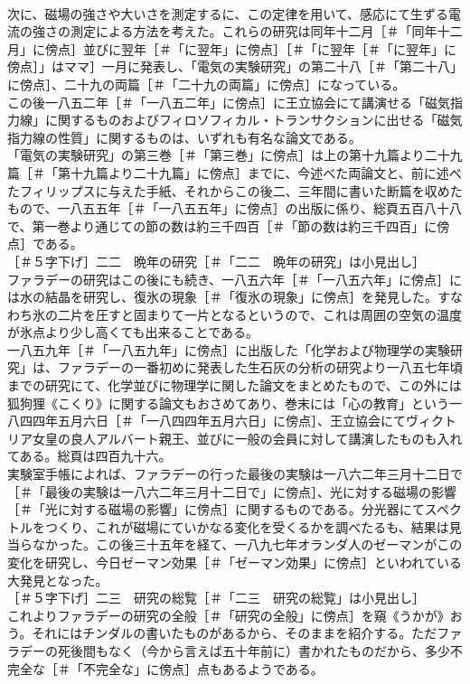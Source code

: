 \documentclass[8pt]{extreport}
\begin{document}
\begin{CJK}{UTF8}{min}
\\	次に、磁場の強さや大いさを測定するに、この定律を用いて、感応にて生ずる電流の強さの測定による方法を考えた。これらの研究は同年十二月［＃「同年十二月」に傍点］並びに翌年［＃「に翌年」に傍点］［＃「に翌年［＃「に翌年」に傍点］」はママ］一月に発表し、「電気の実験研究」の第二十八［＃「第二十八」に傍点］、二十九の両篇［＃「二十九の両篇」に傍点］になっている。
\\	この後一八五二年［＃「一八五二年」に傍点］に王立協会にて講演せる「磁気指力線」に関するものおよびフィロソフィカル・トランサクションに出せる「磁気指力線の性質」に関するものは、いずれも有名な論文である。
\\	「電気の実験研究」の第三巻［＃「第三巻」に傍点］は上の第十九篇より二十九篇［＃「第十九篇より二十九篇」に傍点］までに、今述べた両論文と、前に述べたフィリップスに与えた手紙、それからこの後二、三年間に書いた断篇を収めたもので、一八五五年［＃「一八五五年」に傍点］の出版に係り、総頁五百八十八で、第一巻より通じての節の数は約三千四百［＃「節の数は約三千四百」に傍点］である。
\\	［＃５字下げ］二二　晩年の研究［＃「二二　晩年の研究」は小見出し］
\\	ファラデーの研究はこの後にも続き、一八五六年［＃「一八五六年」に傍点］には水の結晶を研究し、復氷の現象［＃「復氷の現象」に傍点］を発見した。すなわち氷の二片を圧すと固まりて一片となるというので、これは周囲の空気の温度が氷点より少し高くても出来ることである。
\\	一八五九年［＃「一八五九年」に傍点］に出版した「化学および物理学の実験研究」は、ファラデーの一番初めに発表した生石灰の分析の研究より一八五七年頃までの研究にて、化学並びに物理学に関した論文をまとめたもので、この外には狐狗狸《こくり》に関する論文もおさめてあり、巻末には「心の教育」という一八四四年五月六日［＃「一八四四年五月六日」に傍点］、王立協会にてヴィクトリア女皇の良人アルバート親王、並びに一般の会員に対して講演したものも入れてある。総頁は四百九十六。
\\	実験室手帳によれば、ファラデーの行った最後の実験は一八六二年三月十二日で［＃「最後の実験は一八六二年三月十二日で」に傍点］、光に対する磁場の影響［＃「光に対する磁場の影響」に傍点］に関するものである。分光器にてスペクトルをつくり、これが磁場にていかなる変化を受くるかを調べたるも、結果は見当らなかった。この後三十五年を経て、一八九七年オランダ人のゼーマンがこの変化を研究し、今日ゼーマン効果［＃「ゼーマン効果」に傍点］といわれている大発見となった。
\\	［＃５字下げ］二三　研究の総覧［＃「二三　研究の総覧」は小見出し］
\\	これよりファラデーの研究の全般［＃「研究の全般」に傍点］を窺《うかが》おう。それにはチンダルの書いたものがあるから、そのままを紹介する。ただファラデーの死後間もなく（今から言えば五十年前に）書かれたものだから、多少不完全な［＃「不完全な」に傍点］点もあるようである。

\end{CJK}
\end{document}
